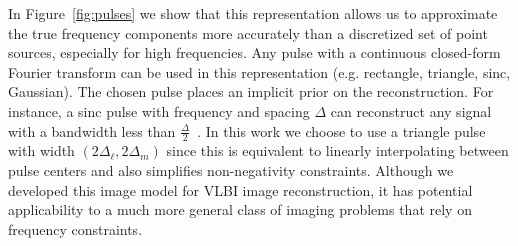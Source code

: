 {			 
In Figure~\ref{fig:pulses} we show that this representation allows us to approximate the true frequency components more accurately than a discretized set of point sources, especially for high frequencies.  
Any pulse with a continuous closed-form Fourier transform can be used in this representation (e.g. rectangle, triangle, sinc, Gaussian). The chosen pulse places an implicit prior on the reconstruction. For instance, a sinc pulse with frequency and spacing $\Delta$ can reconstruct any signal with a bandwidth less than $\frac{\Delta}{2}$~\cite{oppenheim1997signals}. In this work we choose to use a triangle pulse with width $(2\Delta_\ell, 2\Delta_m)$ since this is equivalent to linearly interpolating between pulse centers and also simplifies 
non-negativity constraints. %
Although we developed this image model for VLBI image reconstruction, it has potential applicability to a much more general class of imaging problems that rely on frequency constraints.



}
